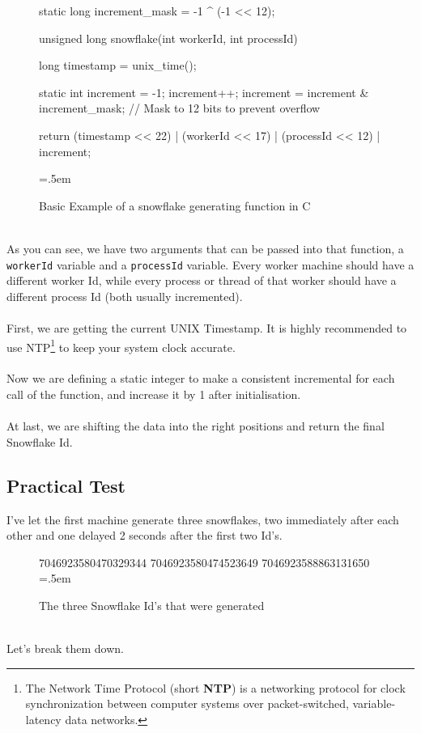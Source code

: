 \documentclass{article}
\newcommand{\code}[1]{\colorbox{cverbbg}{\texttt{#1}}}
\newcommand{\hn}[0]{\hfill \\}
\newenvironment{lcverbatim}
{\SaveVerbatim{cverb}}
{\endSaveVerbatim{}
	\flushleft\fboxrule=0pt\fboxsep=.5em
	\colorbox{cverbbg}{%

		\makebox[\dimexpr\linewidth-2\fboxsep][l]{\BUseVerbatim{cverb}}%
	}
	\endflushleft{}
}
\begin{document}
\begin{figure}[H]
	\begin{lcverbatim}
	static long increment_mask = -1 ^ (-1 << 12);

	unsigned long snowflake(int workerId, int processId)
	{
		long timestamp = unix_time();
	
		static int increment = -1;
		increment++;
		increment = increment & increment_mask;
		// Mask to 12 bits to prevent overflow
	
		return (timestamp << 22)
			| (workerId << 17)
			| (processId << 12)
			| increment;
	}
	\end{lcverbatim}
	\caption{Basic Example of a snowflake generating function in
		C}\label{fig:ex_gen_function}
\end{figure}
\hn{}
As you can see, we have two arguments that can be passed into that function, a
\code{workerId} variable and a \code{processId} variable. Every worker machine
should have a different worker Id, while every process or thread of that worker
should have a different process Id (both usually incremented).\\
\hn{}
First, we are getting the current UNIX Timestamp. It is highly recommended to
use NTP\footnote{The Network Time Protocol (short \textbf{NTP}) is a networking
	protocol for clock synchronization between computer systems over
	packet-switched, variable-latency data networks.} to keep your system
clock
accurate. \\
\hn{}
Now we are defining a static integer to make a consistent incremental for each
call of the function, and increase it by 1 after initialisation. \\
\hn{}
At last, we are shifting the data into the right positions and return the final
Snowflake Id.\@

\pagebreak

\subsection{Practical Test}
I've let the first machine generate three snowflakes, two immediately after
each other and one delayed 2 seconds after the first two Id's.

\begin{figure}[H]
	\begin{lcverbatim}
	7046923580470329344
	7046923580474523649
	7046923588863131650
	\end{lcverbatim}
	\caption{The three Snowflake Id's that were
		generated}\label{fig:output_1}
\end{figure}
\hn{}
Let's break them down. \\
\end{document}
